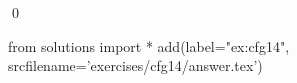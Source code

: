
\begin{ex} 
  \label{ex:cfg14}
  
  \qed
\end{ex} 
\begin{python0}
from solutions import *
add(label="ex:cfg14",
    srcfilename='exercises/cfg14/answer.tex') 
\end{python0}
